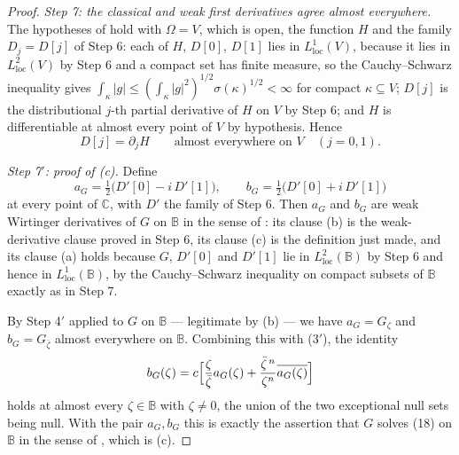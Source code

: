 \begin{proof}
\emph{Step 7: the classical and weak first derivatives agree almost
everywhere.}  The hypotheses of  hold with
$\Omega=V$, which is open, the function $H$ and the family $D_j=D[j]$ of
Step 6: each of $H$, $D[0]$, $D[1]$ lies in $L^1_{\mathrm{loc}}(V)$, because it
lies in $L^2_{\mathrm{loc}}(V)$ by Step 6 and a compact set has finite measure,
so the Cauchy--Schwarz inequality gives
$\int_\kappa|g|\le(\int_\kappa|g|^2)^{1/2}\sigma(\kappa)^{1/2}<\infty$ for
compact $\kappa\subseteq V$; $D[j]$ is the distributional $j$-th partial
derivative of $H$ on $V$ by Step 6; and $H$ is differentiable at almost every
point of $V$ by hypothesis.  Hence
\begin{equation}\tag{4}
  D[j]=\partial_jH\qquad\text{almost everywhere on }V\quad(j=0,1).
\end{equation}

\emph{Step 7$'$: proof of (c).}  Define
\[
  a_G=\tfrac12\bigl(D'[0]-i\,D'[1]\bigr),\qquad
  b_G=\tfrac12\bigl(D'[0]+i\,D'[1]\bigr)
\]
at every point of $\mathbb{C}$, with $D'$ the family of Step 6.  Then $a_G$ and
$b_G$ are weak Wirtinger derivatives of $G$ on $\mathbb{B}$ in the sense of
: its clause (b) is the weak-derivative clause
proved in Step 6, its clause (c) is the definition just made, and its clause
(a) holds because $G$, $D'[0]$ and $D'[1]$ lie in
$L^2_{\mathrm{loc}}(\mathbb{B})$ by Step 6 and hence in
$L^1_{\mathrm{loc}}(\mathbb{B})$, by the Cauchy--Schwarz inequality on compact
subsets of $\mathbb{B}$ exactly as in Step 7.

By Step 4$'$ applied to $G$ on $\mathbb{B}$ --- legitimate by (b) --- we have
$a_G=G_\zeta$ and $b_G=G_{\bar\zeta}$ almost everywhere on $\mathbb{B}$.
Combining this with (3$'$), the identity
\[
  b_G(\zeta)=c\Bigl[\frac{\zeta}{\bar\zeta}a_G(\zeta)
    +\frac{\bar\zeta^{\,n}}{\zeta^{n}}\overline{a_G(\zeta)}\Bigr]
\]
holds at almost every $\zeta\in\mathbb{B}$ with $\zeta\neq0$, the union of the
two exceptional null sets being null.  With the pair $a_G,b_G$ this is exactly
the assertion that $G$ solves (18) on $\mathbb{B}$ in the sense of
, which is (c).


\end{proof}
